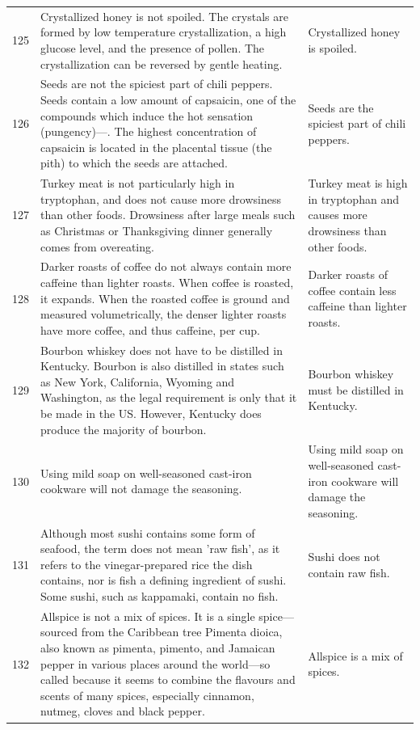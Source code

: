 \begin{tabular}{c|p{}|p{}}
125 & Crystallized honey is not spoiled. The crystals are formed by low temperature crystallization, a high glucose level, and the presence of pollen. The crystallization can be reversed by gentle heating. & Crystallized honey is spoiled. \\
126 & Seeds are not the spiciest part of chili peppers. Seeds contain a low amount of capsaicin, one of the compounds which induce the hot sensation (pungency)—. The highest concentration of capsaicin is located in the placental tissue (the pith) to which the seeds are attached. & Seeds are the spiciest part of chili peppers. \\
127 & Turkey meat is not particularly high in tryptophan, and does not cause more drowsiness than other foods. Drowsiness after large meals such as Christmas or Thanksgiving dinner generally comes from overeating. & Turkey meat is high in tryptophan and causes more drowsiness than other foods. \\
128 & Darker roasts of coffee do not always contain more caffeine than lighter roasts. When coffee is roasted, it expands. When the roasted coffee is ground and measured volumetrically, the denser lighter roasts have more coffee, and thus caffeine, per cup. & Darker roasts of coffee contain less caffeine than lighter roasts. \\
129 & Bourbon whiskey does not have to be distilled in Kentucky. Bourbon is also distilled in states such as New York, California, Wyoming and Washington, as the legal requirement is only that it be made in the US. However, Kentucky does produce the majority of bourbon. & Bourbon whiskey must be distilled in Kentucky. \\
130 & Using mild soap on well-seasoned cast-iron cookware will not damage the seasoning. & Using mild soap on well-seasoned cast-iron cookware will damage the seasoning. \\
131 & Although most sushi contains some form of seafood, the term does not mean 'raw fish', as it refers to the vinegar-prepared rice the dish contains, nor is fish a defining ingredient of sushi. Some sushi, such as kappamaki, contain no fish. & Sushi does not contain raw fish. \\
132 & Allspice is not a mix of spices. It is a single spice—sourced from the Caribbean tree Pimenta dioica, also known as pimenta, pimento, and Jamaican pepper in various places around the world—so called because it seems to combine the flavours and scents of many spices, especially cinnamon, nutmeg, cloves and black pepper. & Allspice is a mix of spices. \\

\end{tabular}
